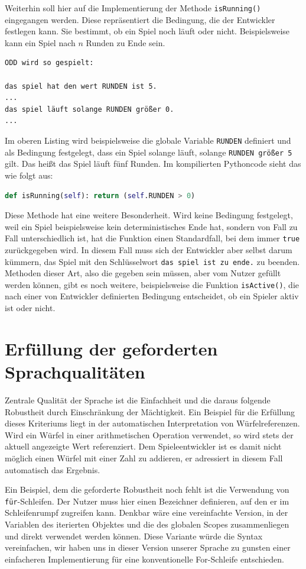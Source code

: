 Weiterhin soll hier auf die Implementierung der Methode \texttt{isRunning()} eingegangen werden. Diese repräsentiert die Bedingung, die der Entwickler festlegen kann. Sie bestimmt, ob ein Spiel noch läuft oder nicht. Beispielsweise kann ein Spiel nach $n$ Runden zu Ende sein.

\begin{lstlisting}[label={lst:ODD}]
ODD wird so gespielt:

das spiel hat den wert RUNDEN ist 5.
...
das spiel läuft solange RUNDEN größer 0.
...
\end{lstlisting}
	Im oberen Listing wird beispielsweise die globale Variable \texttt{RUNDEN} definiert und als Bedingung festgelegt, dass ein Spiel solange läuft, solange \texttt{RUNDEN größer 5} gilt. Das heißt das Spiel läuft fünf Runden. Im kompilierten Pythoncode sieht das wie folgt aus:
\begin{lstlisting}[language=Python]
def isRunning(self): return (self.RUNDEN > 0)
\end{lstlisting}
Diese Methode hat eine weitere Besonderheit. Wird keine Bedingung festgelegt, weil ein Spiel beispielsweise kein deterministisches Ende hat, sondern von Fall zu Fall unterschiedlich ist, hat die Funktion einen Standardfall, bei dem immer \texttt{true} zurückgegeben wird. In diesem Fall muss sich der Entwickler aber selbst darum kümmern, das Spiel mit den Schlüsselwort \texttt{das spiel ist zu ende.} zu beenden. Methoden dieser Art, also die gegeben sein müssen, aber vom Nutzer gefüllt werden können, gibt es noch weitere, beispielsweise die Funktion \texttt{isActive()}, die nach einer von Entwickler definierten Bedingung entscheidet, ob ein Spieler aktiv ist oder nicht.


\section{Erfüllung der geforderten Sprachqualitäten} %
\label{sec:erfullung_der_geforderten_sprachqualitaten}
Zentrale Qualität der Sprache ist die Einfachheit und die daraus folgende Robustheit durch Einschränkung der Mächtigkeit. Ein Beispiel für die Erfüllung dieses Kriteriums liegt in der automatischen Interpretation von Würfelreferenzen. Wird ein Würfel in einer arithmetischen Operation verwendet, so wird stets der aktuell angezeigte Wert referenziert. Dem Spieleentwickler ist es damit nicht möglich einen Würfel mit einer Zahl zu addieren, er adressiert in diesem Fall automatisch das Ergebnis.

Ein Beispiel, dem die geforderte Robustheit noch fehlt ist die Verwendung von \texttt{für}-Schleifen. Der Nutzer muss hier einen Bezeichner definieren, auf den er im Schleifenrumpf zugreifen kann. Denkbar wäre eine vereinfachte Version, in der Variablen des iterierten Objektes und die des globalen Scopes zusammenliegen und direkt verwendet werden können. Diese Variante würde die Syntax vereinfachen, wir haben uns in dieser Version unserer Sprache zu gunsten einer einfacheren Implementierung für eine konventionelle For-Schleife entschieden.

